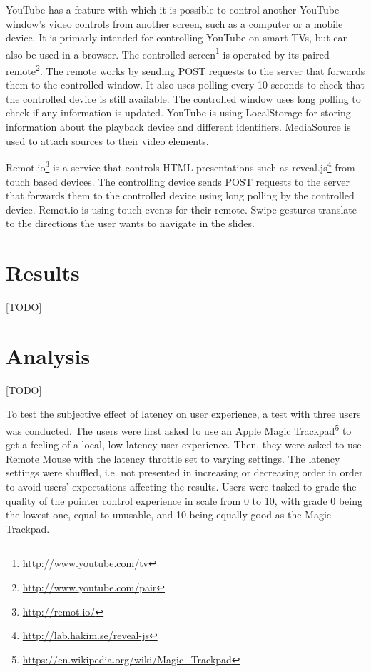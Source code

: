 \documentclass[a4paper,english,twocolumn]{article}
\begin{document}
YouTube has a feature with which it is possible to control another
YouTube window's video controls from another screen, such as a
computer or a mobile device. It is primarly intended for controlling
YouTube on smart TVs, but can also be used in a browser. The
controlled screen\footnote{\url{http://www.youtube.com/tv}} is
operated by its paired
remote\footnote{\url{http://www.youtube.com/pair}}. The remote works
by sending POST requests to the server that forwards them to the
controlled window. It also uses polling every 10 seconds to check that
the controlled device is still available. The controlled window uses
long polling to check if any information is updated. YouTube is using
LocalStorage for storing information about the playback device and
different identifiers. MediaSource is used to attach sources to their
video elements.

Remot.io\footnote{\url{http://remot.io/}} is a service that controls
HTML presentations such as
reveal.js\footnote{\url{http://lab.hakim.se/reveal-js}} from touch
based devices. The controlling device sends POST requests to the
server that forwards them to the controlled device using long polling
by the controlled device. Remot.io is using touch events for their
remote. Swipe gestures translate to the directions the user wants to
navigate in the slides.

\section{Results}

[TODO]



\section{Analysis}

[TODO]

To test the subjective effect of latency on user experience, a test
with three users was conducted. The users were first asked to use an
Apple Magic
Trackpad\footnote{\url{https://en.wikipedia.org/wiki/Magic_Trackpad}}
to get a feeling of a local, low latency user experience. Then, they
were asked to use Remote Mouse with the latency throttle set to
varying settings. The latency settings were shuffled, i.e. not
presented in increasing or decreasing order in order to avoid users'
expectations affecting the results. Users were tasked to grade the
quality of the pointer control experience in scale from 0 to 10, with
grade 0 being the lowest one, equal to unusable, and 10 being equally
good as the Magic Trackpad.
\end{document}
